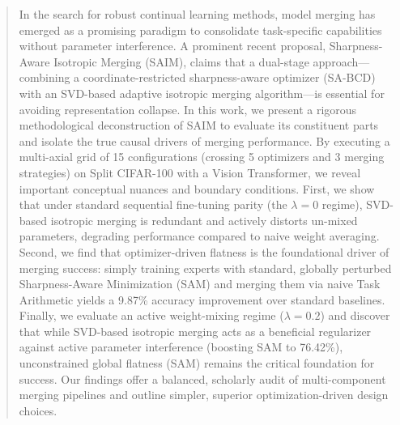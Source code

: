\begin{abstract}
  In the search for robust continual learning methods, model merging has emerged as a promising paradigm to consolidate task-specific capabilities without parameter interference. A prominent recent proposal, Sharpness-Aware Isotropic Merging (SAIM), claims that a dual-stage approach—combining a coordinate-restricted sharpness-aware optimizer (SA-BCD) with an SVD-based adaptive isotropic merging algorithm—is essential for avoiding representation collapse. In this work, we present a rigorous methodological deconstruction of SAIM to evaluate its constituent parts and isolate the true causal drivers of merging performance. By executing a multi-axial grid of 15 configurations (crossing 5 optimizers and 3 merging strategies) on Split CIFAR-100 with a Vision Transformer, we reveal important conceptual nuances and boundary conditions. First, we show that under standard sequential fine-tuning parity (the $\lambda = 0$ regime), SVD-based isotropic merging is redundant and actively distorts un-mixed parameters, degrading performance compared to naive weight averaging. Second, we find that optimizer-driven flatness is the foundational driver of merging success: simply training experts with standard, globally perturbed Sharpness-Aware Minimization (SAM) and merging them via naive Task Arithmetic yields a 9.87\% accuracy improvement over standard baselines. Finally, we evaluate an active weight-mixing regime ($\lambda = 0.2$) and discover that while SVD-based isotropic merging acts as a beneficial regularizer against active parameter interference (boosting SAM to 76.42\%), unconstrained global flatness (SAM) remains the critical foundation for success. Our findings offer a balanced, scholarly audit of multi-component merging pipelines and outline simpler, superior optimization-driven design choices.
\end{abstract}
